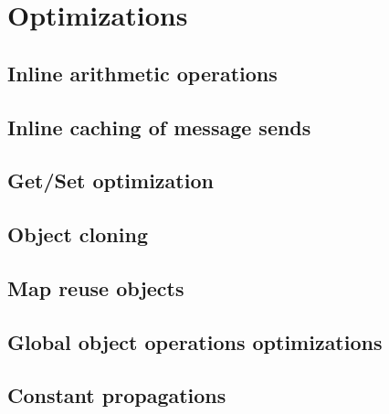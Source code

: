 \chapter{Optimizations}
\label{chap:Optimizations}

\section{Inline arithmetic operations}

\section{Inline caching of message sends}

\section{Get/Set optimization}

\section{Object cloning}

\section{Map reuse objects}

\section{Global object operations optimizations}

\section{Constant propagations}
